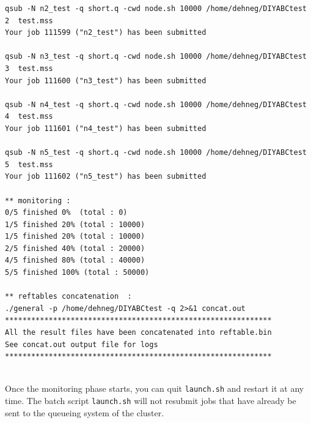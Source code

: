 \begin{minipage}{0.99\textwidth}
\begin{lstlisting}
qsub -N n2_test -q short.q -cwd node.sh 10000 /home/dehneg/DIYABCtest 2  test.mss
Your job 111599 ("n2_test") has been submitted

qsub -N n3_test -q short.q -cwd node.sh 10000 /home/dehneg/DIYABCtest 3  test.mss
Your job 111600 ("n3_test") has been submitted

qsub -N n4_test -q short.q -cwd node.sh 10000 /home/dehneg/DIYABCtest 4  test.mss
Your job 111601 ("n4_test") has been submitted

qsub -N n5_test -q short.q -cwd node.sh 10000 /home/dehneg/DIYABCtest 5  test.mss
Your job 111602 ("n5_test") has been submitted

** monitoring :
0/5 finished 0%  (total : 0)
1/5 finished 20% (total : 10000)
1/5 finished 20% (total : 10000)
2/5 finished 40% (total : 20000)
4/5 finished 80% (total : 40000)
5/5 finished 100% (total : 50000)

** reftables concatenation  :
./general -p /home/dehneg/DIYABCtest -q 2>&1 concat.out
*************************************************************
All the result files have been concatenated into reftable.bin
See concat.out output file for logs
*************************************************************
\end{lstlisting}
   \end{minipage}\\


Once the monitoring phase starts, you can quit \texttt{launch.sh} and restart it at any time. The batch script \texttt{launch.sh} will not resubmit jobs that have already be sent to the queueing system of the cluster. 




